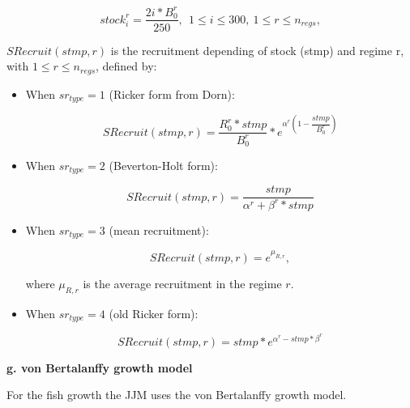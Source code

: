 \documentclass{article}
\begin{document}
\begin{equation}
stock^r_i=\dfrac{2i*B^{r}_0}{250}, \ \ 1\leq i \leq 300, \ 1\leq r \leq n_{regs},
\end{equation}

$SRecruit(stmp, r)$ is the recruitment depending of stock (stmp) and regime r, with $1\leq r \leq n_{regs}$, defined by:
\begin{itemize}

\item When $sr_{type}=1$ (Ricker form from Dorn):

    \begin{equation}
    SRecruit(stmp, r) = \dfrac{R^{r}_0* stmp}{B^{r}_0}*e^{\alpha^r \left(1-\dfrac{stmp}{B^{r}_0}\right)}
    \end{equation}

\item When $sr_{type}=2$ (Beverton-Holt form):

    \begin{equation}
    SRecruit(stmp, r) = \dfrac{stmp}{\alpha^r+\beta^r* stmp}
    \end{equation}

\item When $sr_{type}=3$ (mean recruitment):

    \begin{equation}
    SRecruit(stmp, r) = e^{\mu_{R,r}},
    \end{equation}

    where $\mu_{R,r}$ is the average recruitment in the regime $r$.

\item When $sr_{type}=4$ (old Ricker form):

    \begin{equation}
    SRecruit(stmp, r) =  stmp *e^{\alpha^r-stmp *\beta^r}
    \end{equation}

\end{itemize}


\hfill

\textbf{g. von Bertalanffy growth model}

For the fish growth the JJM uses the von Bertalanffy growth model.
\end{document}
